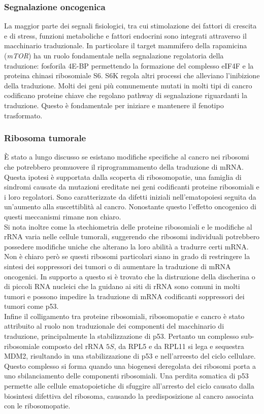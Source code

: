 		\subsubsection{Segnalazione oncogenica}
		La maggior parte dei segnali fisiologici, tra cui stimolazione dei fattori di crescita e di stress, funzioni metaboliche e fattori endocrini sono integrati attraverso il macchinario traduzionale.
		In particolare il target mammifero della rapamicina (\emph{mTOR}) ha un ruolo fondamentale nella segnalazione regolatoria della traduzione: fosforila 4E-BP permettendo la formazione del complesso eIF4F e la proteina chinasi ribosomiale S6.
		S6K regola altri processi che alleviano l'inibizione della traduzione.
		Molti dei geni pi\`u comunemente mutati in molti tipi di cancro codificano proteine chiave che regolano pathway di segnalazione riguardanti la traduzione.
		Questo \`e fondamentale per iniziare e mantenere il fenotipo trasformato.

		\subsubsection{Ribosoma tumorale}
		\`E stato a lungo discusso se esistano modifiche specifiche al cancro nei ribosomi che potrebbero promuovere il riprogrammamento della traduzione di mRNA.
		Questa ipotesi \`e supportata dalla scoperta di ribosomopatie, una famiglia di sindromi causate da mutazioni ereditate nei geni codificanti proteine ribosomiali e i loro regolatori.
		Sono caratterizzate da difetti iniziali nell'ematopoiesi seguita da un'aumento alla suscettiblit\`a al cancro.
		Nonostante questo l'effetto oncogenico di questi meccanismi rimane non chiaro.\\
		Si nota inoltre come la stechiometria delle proteine ribosomiali e le modifiche al rRNA varia nelle cellule tumorali, suggerendo che ribosomi individuali potrebbero possedere modifiche uniche che alterano la loro abilit\`a a tradurre certi mRNA.
		Non \`e chiaro per\`o se questi ribosomi particolari siano in grado di restringere la sintesi dei soppressori dei tumori o di aumentare la traduzione di mRNA oncogenici.
		In supporto a questo si \`e trovato che la distruzione della discherina o di piccoli RNA nucleici che la guidano ai siti di rRNA sono comuni in molti tumori e possono impedire la traduzione di mRNA codificanti soppressori dei tumori come p53.\\
		Infine il colligamento tra proteine ribosomiali, ribosomopatie e cancro \`e stato attribuito al ruolo non traduzionale dei componenti del macchinario di traduzione, principalmente la stabilizzazione di p53.
		Pertanto un complesso sub-ribosomiale composto del rRNA $5S$, da RPL5 e da RPL11 si lega e sequestra MDM2, risultando in una stabilizzazione di p53 e nell'arreesto del ciclo cellulare.
		Questo complesso si forma quando una biogenesi deregolata dei ribosomi porta a uno sbilanciamento delle componenti ribosomiali.
		Una perdita somatica di p53 permette alle cellule ematopoietiche di sfuggire all'arresto del ciclo causato dalla biosintesi difettiva del ribosoma, causando la predisposizione al cancro associata con le ribosomopatie.

